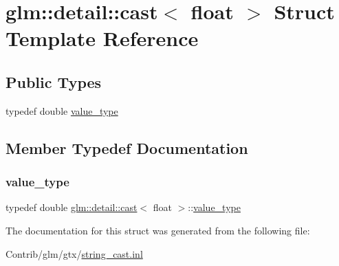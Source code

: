 \hypertarget{structglm_1_1detail_1_1cast_3_01float_01_4}{}\section{glm\+:\+:detail\+:\+:cast$<$ float $>$ Struct Template Reference}
\label{structglm_1_1detail_1_1cast_3_01float_01_4}
\subsection*{Public Types}
\begin{DoxyCompactItemize}
\item 
typedef double \mbox{\hyperlink{structglm_1_1detail_1_1cast_3_01float_01_4_ada0eba4cef43496c87fbb3e3e42f1541}{value\+\_\+type}}
\end{DoxyCompactItemize}


\subsection{Member Typedef Documentation}
\mbox{\label{structglm_1_1detail_1_1cast_3_01float_01_4_ada0eba4cef43496c87fbb3e3e42f1541}} 
\subsubsection{\texorpdfstring{value\+\_\+type}{value\_type}}
{\footnotesize\ttfamily typedef double \mbox{\hyperlink{structglm_1_1detail_1_1cast}{glm\+::detail\+::cast}}$<$ float $>$\+::\mbox{\hyperlink{structglm_1_1detail_1_1cast_3_01float_01_4_ada0eba4cef43496c87fbb3e3e42f1541}{value\+\_\+type}}}



The documentation for this struct was generated from the following file\+:\begin{DoxyCompactItemize}
\item 
Contrib/glm/gtx/\mbox{\hyperlink{string__cast_8inl}{string\+\_\+cast.\+inl}}\end{DoxyCompactItemize}
